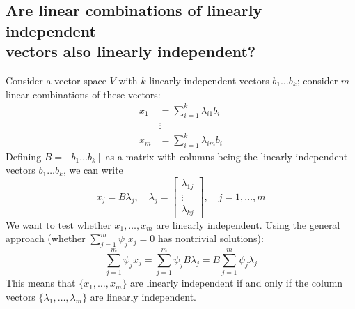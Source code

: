 \documentclass{report}
\begin{document}
\subsection{Are linear combinations of linearly independent\\vectors also linearly independent?} %
\label{fundamentals:ALCOLIVALI}
Consider a vector space $V$ with $k$ linearly independent vectors $b_1\ldots b_k$; 
consider $m$ linear combinations of these vectors:
\begin{align*}
x_1&=\sum^k_{i=1}\lambda_{i1}b_i\\
&\vdots\\
x_m&=\sum^k_{i=1}\lambda_{im}b_i
\end{align*}
Defining $B=[b_1\ldots b_k]$ as a matrix with columns being the linearly independent vectors $b_1\ldots b_k$,
we can write
\begin{equation*}
x_j=B\lambda_j,\quad\lambda_j=\left[\begin{array}{c}
\lambda_{1j}\\\vdots\\\lambda_{kj}\end{array}\right],
\quad j=1,\ldots,m
\end{equation*}
We want to test whether $x_1,\ldots,x_m$ are linearly independent. Using the general 
approach (whether $\sum^m_{j=1}\psi_jx_j=0$ has nontrivial solutions):
\begin{equation*}
\sum^{m}_{j=1}\psi_jx_j
=\sum^{m}_{j=1}\psi_jB\lambda_j
=B\sum^{m}_{j=1}\psi_j\lambda_j
\end{equation*}
This means that $\{x_1,\ldots,x_m\}$ are linearly independent if and only if
the column vectors $\{\lambda_1,\ldots,\lambda_m\}$ are linearly independent.
\newpage
\end{document}
